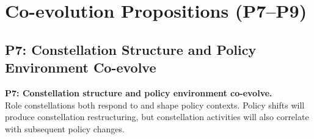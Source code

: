 \documentclass[../main.tex]{subfiles}
\begin{document}
\section{Co-evolution Propositions (P7--P9)}

\subsection{P7: Constellation Structure and Policy Environment Co-evolve}

\begin{propositionbox}
\textbf{P7: Constellation structure and policy environment co-evolve.}\\[3pt]
Role constellations both respond to and shape policy contexts. Policy shifts will produce constellation restructuring, but constellation activities will also correlate with subsequent policy changes.
\end{propositionbox}
\end{document}
